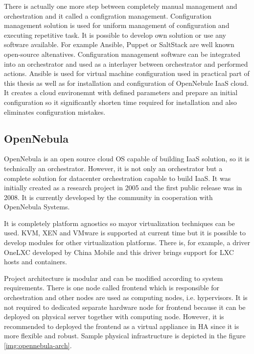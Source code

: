 There is actually one more step between completely manual management and orchestration and it called a configration management. Configuration management solution is used for uniform management of configuration and executing repetitive task. It is possible to develop own solution or use any software available. For example Ansible, Puppet or SaltStack are well known open-source altenatives. Configuration management software can be integrated into an orchestrator and used as a interlayer between orchestrator and performed actions.
Ansible is used for virtual machine configuration used in practical part of this thesis as well as for installation and configuration of OpenNebule IaaS cloud. It creates a cloud environemnt with defined parameters and prepare an initial configuration so it significantly shorten time required for installation and also eliminates configuration mistakes.  

\subsection{OpenNebula}
OpenNebula is an open source cloud OS capable of building IaaS solution, so it is technically an orchestrator. \cite{opennebula} However, it is not only an orchestrator but a complete solution for datacenter orchestration capable to build \Ac{IaaS}. It was initially created as a research project in 2005 and the first public release was in 2008. It is currently developed by the community in cooperation with OpenNebula Systems.

It is completely platform agnostics so mayor virtualization techniques can be used. \Ac{KVM}, XEN and VMware is supported at current time but it is possible to develop modules for other virtualization platforms. There is, for example, a driver OneLXC developed by China Mobile and this driver brings support for \Ac{LXC} hosts and containers.

Project architecture is modular and can be modified according to system requirements. There is one node called frontend which is responsible for orchestration and other nodes are used as computing nodes, i.e. hypervisors. It is not required to dedicated separate hardware node for frontend because it can be deployed on physical server together with computing node. However, it is recommended to deployed the frontend as a virtual appliance in \Ac{HA} since it is more flexible and robust. Sample physical infrastructure is depicted in the figure \ref{img:opennebula-arch}.

